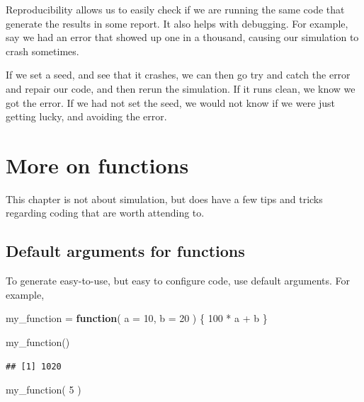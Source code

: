 \documentclass[
]{book}
\newenvironment{Shaded}{\begin{snugshade}}{\end{snugshade}}
\newcommand{\AttributeTok}[1]{\textcolor[rgb]{0.77,0.63,0.00}{#1}}
\newcommand{\ControlFlowTok}[1]{\textcolor[rgb]{0.13,0.29,0.53}{\textbf{#1}}}
\newcommand{\DecValTok}[1]{\textcolor[rgb]{0.00,0.00,0.81}{#1}}
\newcommand{\FunctionTok}[1]{\textcolor[rgb]{0.00,0.00,0.00}{#1}}
\newcommand{\NormalTok}[1]{#1}
\newcommand{\OtherTok}[1]{\textcolor[rgb]{0.56,0.35,0.01}{#1}}
\newcommand{\SpecialCharTok}[1]{\textcolor[rgb]{0.00,0.00,0.00}{#1}}
\begin{document}
Reproducibility allows us to easily check if we are running the same code that generate the results in some report.
It also helps with debugging.
For example, say we had an error that showed up one in a thousand, causing our simulation to crash sometimes.

If we set a seed, and see that it crashes, we can then go try and catch the error and repair our code, and then rerun the simulation.
If it runs clean, we know we got the error.
If we had not set the seed, we would not know if we were just getting lucky, and avoiding the error.

\hypertarget{functions}{%
\chapter{More on functions}\label{functions}}

This chapter is not about simulation, but does have a few tips and tricks regarding coding that are worth attending to.

\hypertarget{default_arguments}{%
\section{Default arguments for functions}\label{default_arguments}}

To generate easy-to-use, but easy to configure code, use default arguments.
For example,

\begin{Shaded}
\begin{Highlighting}[]
\NormalTok{my\_function }\OtherTok{=} \ControlFlowTok{function}\NormalTok{( }\AttributeTok{a =} \DecValTok{10}\NormalTok{, }\AttributeTok{b =} \DecValTok{20}\NormalTok{ ) \{}
     \DecValTok{100} \SpecialCharTok{*}\NormalTok{ a }\SpecialCharTok{+}\NormalTok{ b}
\NormalTok{\}}

\FunctionTok{my\_function}\NormalTok{()}
\end{Highlighting}
\end{Shaded}

\begin{verbatim}
## [1] 1020
\end{verbatim}

\begin{Shaded}
\begin{Highlighting}[]
\FunctionTok{my\_function}\NormalTok{( }\DecValTok{5}\NormalTok{ )}
\end{Highlighting}
\end{Shaded}
\end{document}
